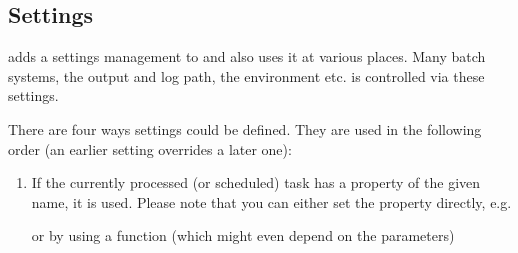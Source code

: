 \documentclass[letterpaper,10pt,english]{sphinxmanual}
\begin{document}
\subsection{Settings}
\label{\detokenize{documentation/api:settings}}

\begin{fulllineitems}
\label{\detokenize{documentation/api:b2luigi.get_setting}}
 adds a settings management to 
and also uses it at various places.
Many batch systems, the output and log path, the environment
etc. is controlled via these settings.

There are four ways settings could be defined.
They are used in the following order (an earlier setting
overrides a later one):
\begin{enumerate}
%
\item {} 
If the currently processed (or scheduled) task has a property
of the given name, it is used.
Please note that you can either set the property directly, e.g.

\begin{sphinxVerbatim}[commandchars=\\\{\}]
 
      
\end{sphinxVerbatim}

or by using a function (which might even depend on the parameters)

\begin{sphinxVerbatim}[commandchars=\\\{\}]
 
     
         
\end{sphinxVerbatim}


\end{enumerate}
\end{fulllineitems}
\end{document}
